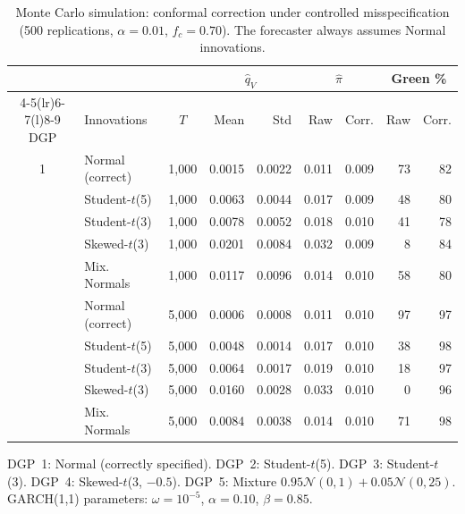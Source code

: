 \begin{table}[htbp]
\centering
\caption{Monte Carlo simulation: conformal correction under controlled misspecification (500 replications, $\alpha = 0.01$, $f_c = 0.70$). The forecaster always assumes Normal innovations.}
\label{tab:simulation_extended}
\footnotesize
\begin{tabular}{@{}clc rr rr rr@{}}
\toprule
& & & \multicolumn{2}{c}{$\hat{q}_V$} & \multicolumn{2}{c}{$\hat\pi$} & \multicolumn{2}{c}{Green \%} \\
\cmidrule(lr){4-5}\cmidrule(lr){6-7}\cmidrule(l){8-9}
DGP & Innovations & $T$ & Mean & Std & Raw & Corr. & Raw & Corr. \\
\midrule
1 & Normal (correct) & 1,000 & 0.0015 & 0.0022 & 0.011 & 0.009 & 73 & 82 \\
\addlinespace
2 & Student-$t$(5) & 1,000 & 0.0063 & 0.0044 & 0.017 & 0.009 & 48 & 80 \\
\addlinespace
3 & Student-$t$(3) & 1,000 & 0.0078 & 0.0052 & 0.018 & 0.010 & 41 & 78 \\
\addlinespace
4 & Skewed-$t$(3) & 1,000 & 0.0201 & 0.0084 & 0.032 & 0.009 & 8 & 84 \\
\addlinespace
5 & Mix. Normals & 1,000 & 0.0117 & 0.0096 & 0.014 & 0.010 & 58 & 80 \\
\addlinespace
1 & Normal (correct) & 5,000 & 0.0006 & 0.0008 & 0.011 & 0.010 & 97 & 97 \\
\addlinespace
2 & Student-$t$(5) & 5,000 & 0.0048 & 0.0014 & 0.017 & 0.010 & 38 & 98 \\
\addlinespace
3 & Student-$t$(3) & 5,000 & 0.0064 & 0.0017 & 0.019 & 0.010 & 18 & 97 \\
\addlinespace
4 & Skewed-$t$(3) & 5,000 & 0.0160 & 0.0028 & 0.033 & 0.010 & 0 & 96 \\
\addlinespace
5 & Mix. Normals & 5,000 & 0.0084 & 0.0038 & 0.014 & 0.010 & 71 & 98 \\
\bottomrule
\end{tabular}
\begin{minipage}{\linewidth}\footnotesize
\smallskip
DGP~1: Normal (correctly specified). DGP~2: Student-$t$(5). DGP~3: Student-$t$(3). DGP~4: Skewed-$t$(3, $-0.5$). DGP~5: Mixture $0.95 \mathcal{N}(0,1) + 0.05\mathcal{N}(0,25)$. GARCH(1,1) parameters: $\omega = 10^{-5}$, $\alpha = 0.10$, $\beta = 0.85$.
\end{minipage}
\end{table}